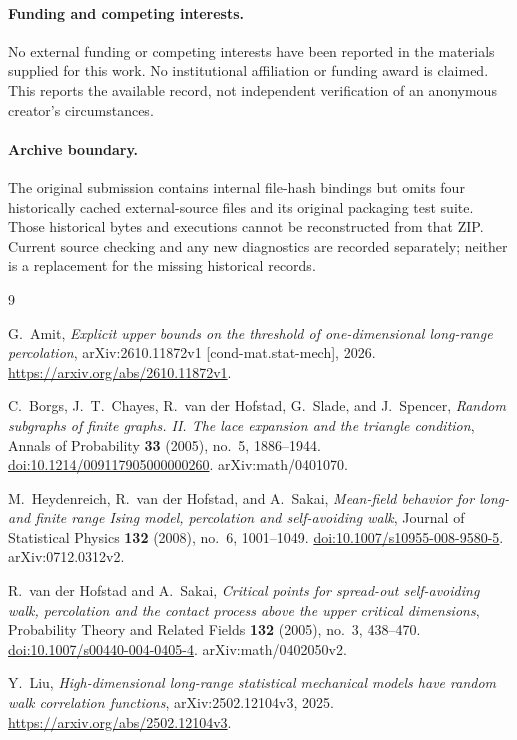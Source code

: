 \documentclass[11pt]{article}
\theoremstyle{definition}
\begin{document}
\paragraph{Funding and competing interests.}
No external funding or competing interests have been reported in the
materials supplied for this work. No institutional affiliation or funding
award is claimed. This reports the available record, not independent
verification of an anonymous creator's circumstances.

\paragraph{Archive boundary.}
The original submission contains internal file-hash bindings but omits four
historically cached external-source files and its original packaging test suite.
Those historical bytes and executions cannot be reconstructed from that ZIP.
Current source checking and any new diagnostics are recorded separately;
neither is a replacement for the missing historical records.

\begin{thebibliography}{9}

G.~Amit,
\emph{Explicit upper bounds on the threshold of one-dimensional long-range
percolation},
arXiv:2610.11872v1 [cond-mat.stat-mech], 2026.
\url{https://arxiv.org/abs/2610.11872v1}.

C.~Borgs, J.~T.~Chayes, R.~van der Hofstad, G.~Slade, and J.~Spencer,
\emph{Random subgraphs of finite graphs. II. The lace expansion and the
triangle condition},
Annals of Probability \textbf{33} (2005), no.~5, 1886--1944.
\href{https://doi.org/10.1214/009117905000000260}{doi:10.1214/009117905000000260}.
arXiv:math/0401070.

M.~Heydenreich, R.~van der Hofstad, and A.~Sakai,
\emph{Mean-field behavior for long- and finite range Ising model, percolation
and self-avoiding walk},
Journal of Statistical Physics \textbf{132} (2008), no.~6, 1001--1049.
\href{https://doi.org/10.1007/s10955-008-9580-5}{doi:10.1007/s10955-008-9580-5}.
arXiv:0712.0312v2.

R.~van der Hofstad and A.~Sakai,
\emph{Critical points for spread-out self-avoiding walk, percolation and the
contact process above the upper critical dimensions},
Probability Theory and Related Fields \textbf{132} (2005), no.~3, 438--470.
\href{https://doi.org/10.1007/s00440-004-0405-4}{doi:10.1007/s00440-004-0405-4}.
arXiv:math/0402050v2.

Y.~Liu,
\emph{High-dimensional long-range statistical mechanical models have random
walk correlation functions}, arXiv:2502.12104v3, 2025.
\url{https://arxiv.org/abs/2502.12104v3}.

\end{thebibliography}
\end{document}
